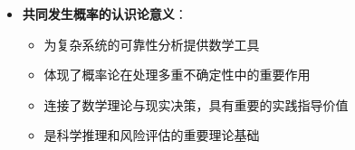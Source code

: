 \begin{center}
{{\begin{itemize}
\begin{itemize}
  \item \textbf{计算验证}：可通过列举所有等可能情况进行验证
  \end{itemize}
\item \textbf{共同发生概率的认识论意义}：
  \begin{itemize}
  \item 为复杂系统的可靠性分析提供数学工具
  \item 体现了概率论在处理多重不确定性中的重要作用
  \item 连接了数学理论与现实决策，具有重要的实践指导价值
  \item 是科学推理和风险评估的重要理论基础
  \end{itemize}
\end{itemize}
}}
\end{center}

